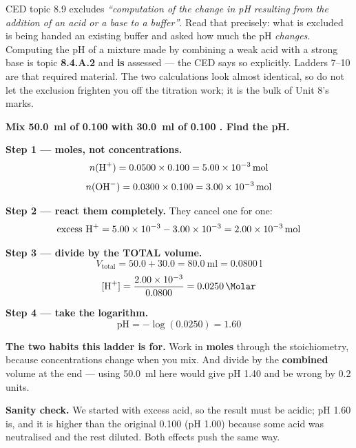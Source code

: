 \documentclass{apchem-worksheet}
\begin{document}
\begin{apcnote}
CED topic 8.9 excludes \emph{``computation of the change in pH
resulting from the addition of an acid or a base to a buffer''}. Read
that precisely: what is excluded is being handed an existing buffer and
asked how much the pH \emph{changes}. Computing the pH of a mixture
made by combining a weak acid with a strong base is topic
\textbf{8.4.A.2} and \textbf{is} assessed --- the CED says so
explicitly. Ladders 7--10 are that required material. The two
calculations look almost identical, so do not let the exclusion
frighten you off the titration work; it is the bulk of Unit 8's marks.
\end{apcnote}

\begin{workedexample}
\textbf{Mix \SI{50.0}{\milli\litre} of \SI{0.100}{\Molar} 
with \SI{30.0}{\milli\litre} of \SI{0.100}{\Molar} . Find the
pH.}

\textbf{Step 1 --- moles, not concentrations.}
\[ n(\ce{H+}) = 0.0500 \times 0.100 = \SI{5.00e-3}{\mole} \]
\[ n(\ce{OH-}) = 0.0300 \times 0.100 = \SI{3.00e-3}{\mole} \]

\textbf{Step 2 --- react them completely.} They cancel one for one:
\[ \text{excess } \ce{H+} = 5.00 \times 10^{-3} - 3.00 \times 10^{-3}
   = \SI{2.00e-3}{\mole} \]

\textbf{Step 3 --- divide by the TOTAL volume.}
\[ V_{\text{total}} = 50.0 + 30.0 = \SI{80.0}{\milli\litre}
   = \SI{0.0800}{\litre} \]
\[ [\ce{H+}] = \frac{\num{2.00e-3}}{0.0800}
   = \SI{0.0250}{\Molar} \]

\textbf{Step 4 --- take the logarithm.}
\[ \text{pH} = -\log(0.0250) = \mathbf{1.60} \]

\textbf{The two habits this ladder is for.} Work in \textbf{moles}
through the stoichiometry, because concentrations change when you mix.
And divide by the \textbf{combined} volume at the end --- using
\SI{50.0}{\milli\litre} here would give pH 1.40 and be wrong by
0.2 units.

\textbf{Sanity check.} We started with excess acid, so the result must
be acidic; pH 1.60 is, and it is higher than the original
\SI{0.100}{\Molar}  (pH 1.00) because some acid was neutralised
and the rest diluted. Both effects push the same way.
\end{workedexample}
\end{document}
